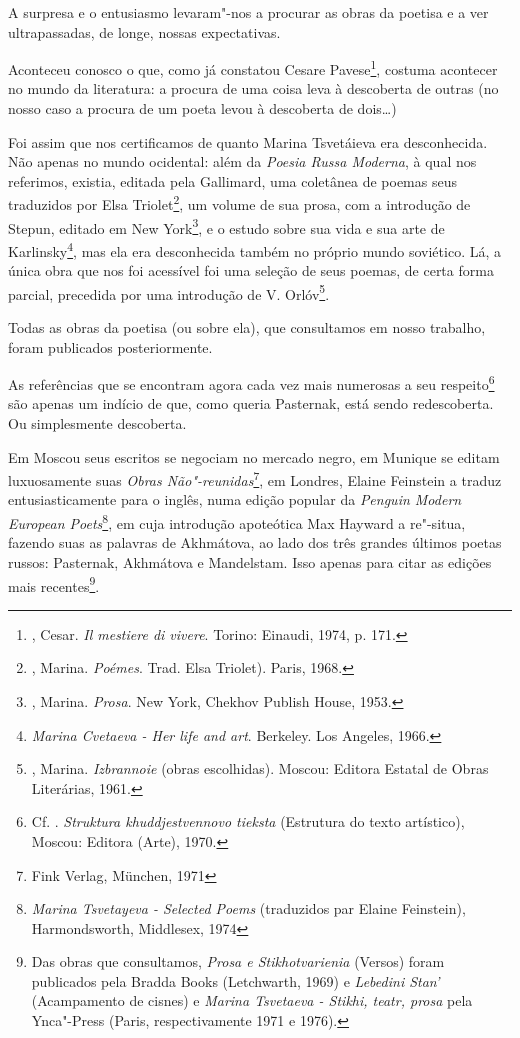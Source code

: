 A surpresa e o entusiasmo levaram"-nos a procurar as obras da poetisa e a
ver ultrapassadas, de longe, nossas expectativas.

Aconteceu conosco o que, como já constatou Cesare Pavese\footnote{,
  Cesar. \emph{Il mestiere di vivere}. Torino: Einaudi, 1974, p. 171.},
costuma acontecer no mundo da literatura: a procura de uma coisa leva à
descoberta de outras (no nosso caso a procura de um poeta levou à
descoberta de dois\ldots{})

Foi assim que nos certificamos de quanto Marina Tsvetáieva era
desconhecida. Não apenas no mundo ocidental: além da \emph{Poesia Russa
Moderna}, à qual nos referimos, existia, editada pela Gallimard, uma
coletânea de poemas seus traduzidos por Elsa Triolet\footnote{,
  Marina. \emph{Poémes}. Trad. Elsa Triolet). Paris, 1968.}, um volume
de sua prosa, com a introdução de  Stepun, editado em New
York\footnote{, Marina. \emph{Prosa}. New York, Chekhov Publish
  House, 1953.}, e o estudo sobre sua vida e sua arte de 
Karlinsky\footnote{\emph{Marina Cvetaeva - Her life and art}. Berkeley.
  Los Angeles, 1966.}, mas ela era desconhecida também no próprio mundo
soviético. Lá, a única obra que nos foi acessível foi uma seleção de
seus poemas, de certa forma parcial, precedida por uma introdução de V.
Orlóv\footnote{, Marina. \emph{Izbrannoie} (obras escolhidas).
  Moscou: Editora Estatal de Obras Literárias, 1961.}.

Todas as obras da poetisa (ou sobre ela), que consultamos em nosso
trabalho, foram publicados posteriormente.

As referências que se encontram agora cada vez mais numerosas a seu
respeito\footnote{Cf. . \emph{Struktura khuddjestvennovo
  tieksta} (Estrutura do texto artístico), Moscou: Editora (Arte), 1970.}
são apenas um indício de que, como queria Pasternak, está sendo
redescoberta. Ou simplesmente descoberta.

Em Moscou seus escritos se negociam no mercado negro, em Munique se
editam luxuosamente suas \emph{Obras Não"-reunidas}\footnote{Fink Verlag,
  München, 1971}, em Londres, Elaine Feinstein a traduz
entusiasticamente para o inglês, numa edição popular da \emph{Penguin
Modern European Poets}\footnote{\emph{Marina Tsvetayeva - Selected
  Poems} (traduzidos par Elaine Feinstein), Harmondsworth, Middlesex,
  1974}, em cuja introdução apoteótica Max Hayward a re"-situa, fazendo
suas as palavras de  Akhmátova, ao lado dos três grandes últimos
poetas russos: Pasternak, Akhmátova e Mandelstam. Isso apenas para citar
as edições mais recentes\footnote{Das obras que consultamos, \emph{Prosa
  e Stikhotvarienia} (Versos) foram publicados pela Bradda Books
  (Letchwarth, 1969) e \emph{Lebedini Stan'} (Acampamento de cisnes) e
  \emph{Marina Tsvetaeva - Stikhi, teatr, prosa} pela Ynca"-Press (Paris,
  respectivamente 1971 e 1976).}.

